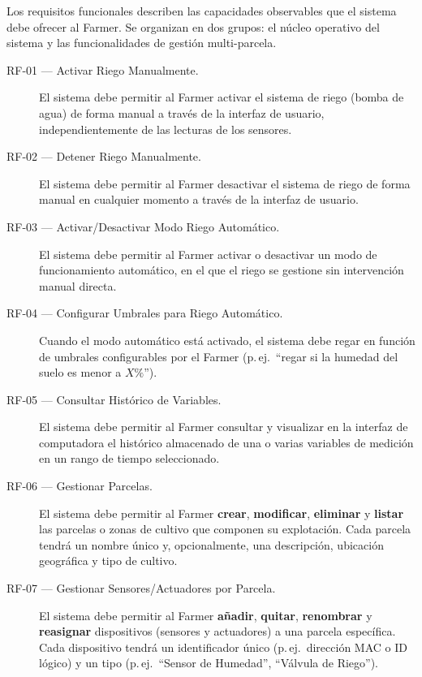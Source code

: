 Los requisitos funcionales describen las capacidades observables que el sistema debe ofrecer
al Farmer. Se organizan en dos grupos: el núcleo operativo del sistema y las funcionalidades
de gestión multi-parcela.

\begin{description}
	
	\item[RF-01 — Activar Riego Manualmente.]
	El sistema debe permitir al Farmer activar el sistema de riego (bomba de agua) de forma
	manual a través de la interfaz de usuario, independientemente de las lecturas de los
	sensores.
	
	\item[RF-02 — Detener Riego Manualmente.]
	El sistema debe permitir al Farmer desactivar el sistema de riego de forma manual en
	cualquier momento a través de la interfaz de usuario.
	
	\item[RF-03 — Activar/Desactivar Modo Riego Automático.]
	El sistema debe permitir al Farmer activar o desactivar un modo de funcionamiento
	automático, en el que el riego se gestione sin intervención manual directa.
	
	\item[RF-04 — Configurar Umbrales para Riego Automático.]
	Cuando el modo automático está activado, el sistema debe regar en función de umbrales
	configurables por el Farmer (p.\,ej.\ ``regar si la humedad del suelo es menor a
	\(X\%\)'').
	
	\item[RF-05 — Consultar Histórico de Variables.]
	El sistema debe permitir al Farmer consultar y visualizar en la interfaz de computadora
	el histórico almacenado de una o varias variables de medición en un rango de tiempo
	seleccionado.
	
	\item[RF-06 — Gestionar Parcelas.]
	El sistema debe permitir al Farmer \textbf{crear}, \textbf{modificar}, \textbf{eliminar}
	y \textbf{listar} las parcelas o zonas de cultivo que componen su explotación. Cada
	parcela tendrá un nombre único y, opcionalmente, una descripción, ubicación geográfica
	y tipo de cultivo.
	
	\item[RF-07 — Gestionar Sensores/Actuadores por Parcela.]
	El sistema debe permitir al Farmer \textbf{añadir}, \textbf{quitar}, \textbf{renombrar}
	y \textbf{reasignar} dispositivos (sensores y actuadores) a una parcela específica. Cada
	dispositivo tendrá un identificador único (p.\,ej.\ dirección MAC o ID lógico) y un tipo
	(p.\,ej.\ ``Sensor de Humedad'', ``Válvula de Riego'').
	

\end{description}
